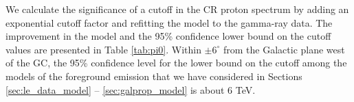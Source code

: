 We calculate the significance of a cutoff in the CR proton spectrum by adding an exponential cutoff factor and refitting the model to the gamma-ray data.
The improvement in the model and the 95\% confidence lower bound on the cutoff values are presented in Table \ref{tab:pi0}.
Within $\pm 6^\circ$ from the Galactic plane west of the GC, the 95\% confidence level for the lower bound on the cutoff among the models
of the foreground emission that we have considered in Sections \ref{sec:le_data_model} -- \ref{sec:galprop_model} is about 6 TeV.

